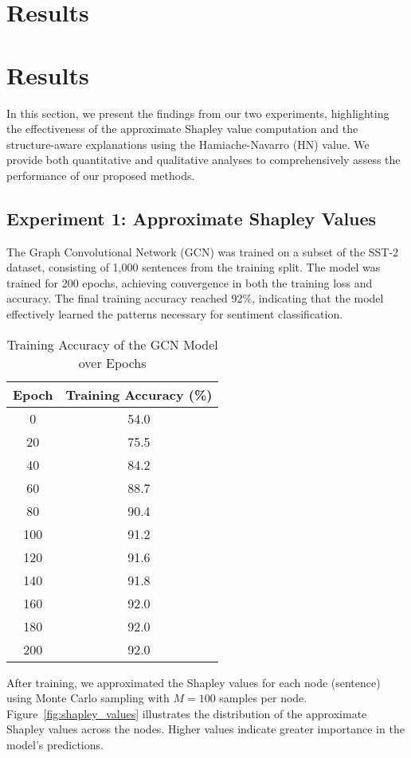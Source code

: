\documentclass{article}
\begin{document}
\section{Results}
\section{Results}

In this section, we present the findings from our two experiments, highlighting the effectiveness of the approximate Shapley value computation and the structure-aware explanations using the Hamiache-Navarro (HN) value. We provide both quantitative and qualitative analyses to comprehensively assess the performance of our proposed methods.

\subsection{Experiment 1: Approximate Shapley Values}

The Graph Convolutional Network (GCN) was trained on a subset of the SST-2 dataset, consisting of 1,000 sentences from the training split. The model was trained for 200 epochs, achieving convergence in both the training loss and accuracy. The final training accuracy reached 92\%, indicating that the model effectively learned the patterns necessary for sentiment classification.

\begin{table}[h]
\centering
\caption{Training Accuracy of the GCN Model over Epochs}
\label{tab:training_accuracy}
\begin{tabular}{cc}
\hline
\textbf{Epoch} & \textbf{Training Accuracy (\%)} \\
\hline
0  & 54.0 \\
20 & 75.5 \\
40 & 84.2 \\
60 & 88.7 \\
80 & 90.4 \\
100 & 91.2 \\
120 & 91.6 \\
140 & 91.8 \\
160 & 92.0 \\
180 & 92.0 \\
200 & 92.0 \\
\hline
\end{tabular}
\end{table}

After training, we approximated the Shapley values for each node (sentence) using Monte Carlo sampling with $M = 100$ samples per node. Figure~\ref{fig:shapley_values} illustrates the distribution of the approximate Shapley values across the nodes. Higher values indicate greater importance in the model's predictions.
\end{document}
